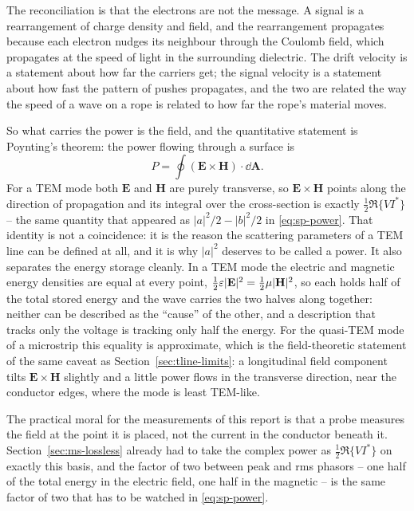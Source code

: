 The reconciliation is that the electrons are not the message. A signal is a rearrangement of charge density and
field, and the rearrangement propagates because each electron nudges its neighbour through the Coulomb field,
which propagates at the speed of light in the surrounding dielectric. The drift velocity is a statement about how
far the carriers get; the signal velocity is a statement about how fast the pattern of pushes propagates, and the
two are related the way the speed of a wave on a rope is related to how far the rope's material moves.

So what carries the power is the field, and the quantitative statement is Poynting's theorem: the power flowing
through a surface is
\begin{equation}
  P = \oint \left(\mathbf{E}\times\mathbf{H}\right)\cdot\dd\mathbf{A} .
  \label{eq:sp-poynting}
\end{equation}
For a TEM mode both $\mathbf{E}$ and $\mathbf{H}$ are purely transverse, so $\mathbf{E}\times\mathbf{H}$ points
along the direction of propagation and its integral over the cross-section is exactly
$\tfrac12\Re\{VI^*\}$ -- the same quantity that appeared as $|a|^2/2-|b|^2/2$ in \eqref{eq:sp-power}. That identity
is not a coincidence: it is the reason the scattering parameters of a TEM line can be defined at all, and it is
why $|a|^2$ deserves to be called a power. It also separates the energy storage cleanly. In a TEM mode the
electric and magnetic energy densities are equal at every point,
$\tfrac12\varepsilon|\mathbf{E}|^2=\tfrac12\mu|\mathbf{H}|^2$, so each holds half of the total stored energy and the
wave carries the two halves along together: neither can be described as the ``cause'' of the other, and a
description that tracks only the voltage is tracking only half the energy. For the quasi-TEM mode of a microstrip
this equality is approximate, which is the field-theoretic statement of the same caveat as
Section~\ref{sec:tline-limits}: a longitudinal field component tilts $\mathbf{E}\times\mathbf{H}$ slightly and a
little power flows in the transverse direction, near the conductor edges, where the mode is least TEM-like.

The practical moral for the measurements of this report is that a probe measures the field at the point it is
placed, not the current in the conductor beneath it. Section~\ref{sec:ms-lossless} already had to take the
complex power as $\tfrac12\Re\{VI^*\}$ on exactly this basis, and the factor of two between peak and rms phasors
-- one half of the total energy in the electric field, one half in the magnetic -- is the same factor of two that
has to be watched in \eqref{eq:sp-power}.

